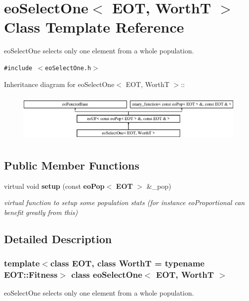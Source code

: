 \section{eo\-Select\-One$<$ EOT, Worth\-T $>$ Class Template Reference}
\label{classeo_select_one}
eo\-Select\-One selects only one element from a whole population.  


{\tt \#include $<$eo\-Select\-One.h$>$}

Inheritance diagram for eo\-Select\-One$<$ EOT, Worth\-T $>$::\begin{figure}[H]
\begin{center}
\leavevmode
\includegraphics[height=2.42775cm]{classeo_select_one}
\end{center}
\end{figure}
\subsection*{Public Member Functions}
\begin{CompactItemize}
\item 
virtual void {\bf setup} (const {\bf eo\-Pop}$<$ {\bf EOT} $>$ \&\_\-pop)\label{classeo_select_one_a0}

\begin{CompactList}\small\item\em virtual function to setup some population stats (for instance eo\-Proportional can benefit greatly from this) \item\end{CompactList}\end{CompactItemize}


\subsection{Detailed Description}
\subsubsection*{template$<$class EOT, class Worth\-T = typename EOT::Fitness$>$ class eo\-Select\-One$<$ EOT, Worth\-T $>$}

eo\-Select\-One selects only one element from a whole population. 

